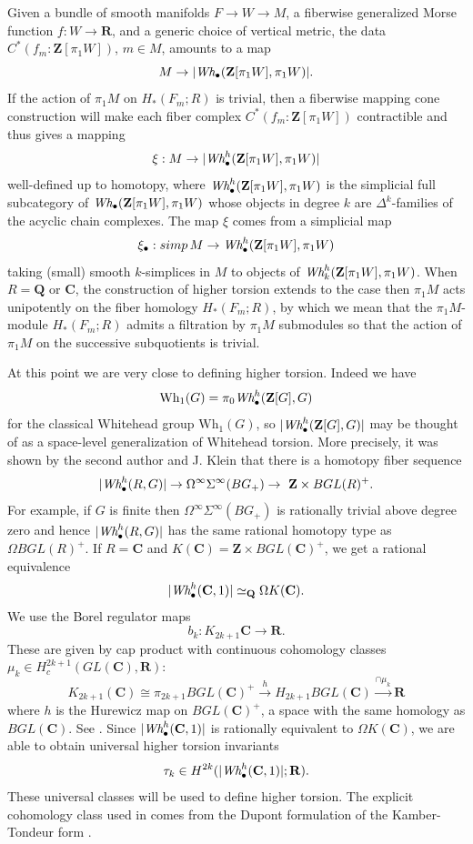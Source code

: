 \documentclass{amsart}
\def\bC{\mathbf{C}}
\def\bQ{\mathbf{Q}}
\def\bR{\mathbf{R}}
\def\bZ{\mathbf{Z}}
\theoremstyle{definition}
\theoremstyle{remark}
\newtheorem{inductive lemma}[theorem]{Inductive Lemma}
\begin{document}
Given a bundle of smooth manifolds $F \to W \to M$, a fiberwise generalized Morse function $f:W \to \bR$, and a generic choice of vertical metric, the data $C^*(f_m:\bZ[\pi_1W])$, $m \in M$, amounts to a map
$$  M \to | \text{\em Wh}_\bullet(\bZ[\pi_1W],\pi_1W)|.$$
If the action of $\pi_1 M$ on $H_*(F_m;R)$ is trivial, then a fiberwise mapping cone construction will make each fiber complex $C^*(f_m:\bZ[\pi_1W])$ contractible and thus gives a mapping
$$ \xi:M \to |\text{\em Wh}_\bullet^h(\bZ[\pi_1W],\pi_1W)| $$
well-defined up to homotopy, where $\text{\em Wh}_\bullet^h(\bZ[\pi_1W],\pi_1W)$ is the simplicial full subcategory of $ \text{\em Wh}_\bullet(\bZ[\pi_1W],\pi_1W)$ whose objects in degree $k$ are $\Delta^k$-families of the acyclic chain complexes. The map $\xi$ comes from a simplicial map
\[
    \xi_\bullet: simp\,M\to \text{\em Wh}_\bullet^h(\bZ[\pi_1W],\pi_1W)
\]
taking (small) smooth $k$-simplices in $M$ to objects of $\text{\em Wh}_k^h(\bZ[\pi_1W],\pi_1W)$. When $R = \bQ$ or $\bC$, the construction of higher torsion extends to the case then $\pi_1M$
acts unipotently on the fiber homology $H_*(F_m;R)$, by which we mean that the $\pi_1M$-module $H_*(F_m;R)$ admits a filtration by $\pi_1M$ submodules so that the action of $\pi_1M$ on the successive subquotients is trivial.

At this point we are very close to defining higher torsion. Indeed we have
$$\text{Wh}_1(G) = \pi_0 \text{\em Wh}_\bullet^h(\bZ[G],G) $$
for the classical Whitehead group $\text{Wh}_1(G)$, so $|\text{\em Wh}_\bullet^h(\bZ[G],G)|$ may be thought of as a space-level generalization of Whitehead torsion. More precisely, it was shown by the second author and J. Klein that there is a homotopy fiber sequence
$$|\text{\em Wh}_\bullet^h(R,G)| \to \Omega^\infty \Sigma^\infty(BG_+) \to\ \bZ \times  BGL(R)^+. $$
For example, if $G$ is finite then $\Omega^\infty \Sigma^\infty(BG_+)$ is rationally trivial above degree zero and hence $|\text{\em Wh}_\bullet^h(R,G)|$ has the same rational homotopy type as $\Omega BGL(R)^+$. If $R = \bC$ and $K(\bC)=\bZ \times BGL(\bC)^+$, we get a rational equivalence
$$ |\text{\em Wh}_\bullet^h(\bC,1)| \simeq_\bQ \Omega K(\bC).$$
We use the Borel regulator maps
$$b_k:K_{2k+1}\bC \to  \bR.$$
These are given by cap product with continuous cohomology classes $\mu_k\in H_c^{2k+1}(GL(\bC),\bR)$:
\[
K_{2k+1}(\bC)\cong \pi_{2k+1}BGL(\bC)^+\xrightarrow h H_{2k+1}BGL(\bC)\xrightarrow{\cap \mu_k}\bR
\]
where $h$ is the Hurewicz map on $BGL(\bC)^+$, a space with the same homology as $BGL(\bC)$.
See \cite{Dinakar}. Since $|\text{\em Wh}_\bullet^h(\bC,1)|$ is rationally equivalent to $\Omega K(\bC)$, we are able to obtain universal higher torsion invariants
$$\tau_{k} \in H^{2k}(|\text{\em Wh}_\bullet^h(\bC,1)|;\bR). $$
These universal classes will be used to define higher torsion. The explicit cohomology class used in \cite{I02} comes from the Dupont formulation of the Kamber-Tondeur form \cite{Dupont}.
\end{document}
